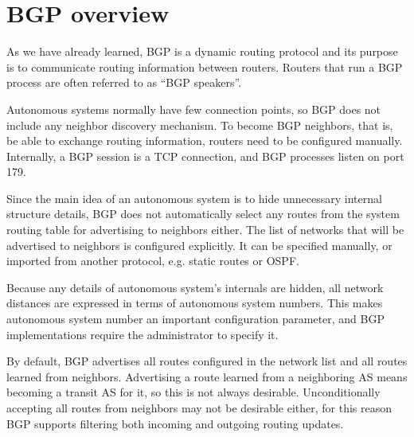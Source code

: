 \chapter{BGP overview}

As we have already learned, BGP is a dynamic routing protocol and its purpose
is to communicate routing information between routers. Routers that run a BGP process
are often referred to as ``BGP speakers''.

Autonomous systems normally have few connection points, so BGP does not include any
neighbor discovery mechanism. To become BGP neighbors, that is, be able to exchange
routing information, routers need to be configured manually. Internally, a BGP session
is a TCP connection, and BGP processes listen on port 179.

Since the main idea of an autonomous system is to hide unnecessary internal structure
details, BGP does not automatically select any routes from the system routing table
for advertising to neighbors either.
The list of networks that will be advertised to neighbors is configured explicitly.
It can be specified manually, or imported from another protocol, e.g. static routes or
OSPF.

Because any details of autonomous system's internals are hidden, all network distances
are expressed in terms of autonomous system numbers. This makes autonomous system number
an important configuration parameter, and BGP implementations require the administrator
to specify it. 

By default, BGP advertises all routes configured in the network list and all routes learned
from neighbors. Advertising a route learned from a neighboring AS means becoming a transit
AS for it, so this is not always desirable. Unconditionally accepting all routes from
neighbors may not be desirable either, for this reason BGP supports filtering both
incoming and outgoing routing updates.
